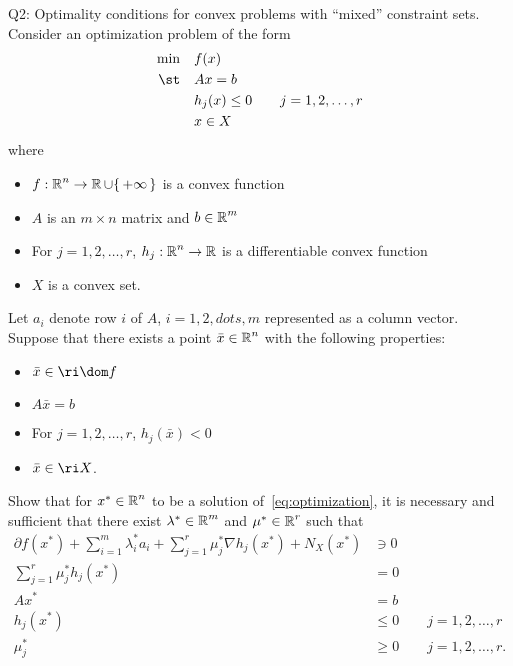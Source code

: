 \documentclass{article}
\begin{document}
\begin{problem}
    {Q2: Optimality conditions for convex problems with ``mixed'' constraint sets.}
    Consider an optimization problem of the form
    \begin{equation}
        \begin{aligned}
            \min & \quad f(x) \\
            \st & \quad Ax=b \\
            & \quad h_j(x)\leq 0 \qquad j=1,2,\dots,r \\
            & \quad x\in X
        \end{aligned}
        \label{eq:optimization}
    \end{equation}
    where
    \begin{itemize}
        \item $f:\R^n\rightarrow\R\cup\set{+\infty}$ is a convex function
        \item $A$ is an $m\times n$ matrix and $b\in\operatorname{\mathbb{R}}^m$
        \item For $j=1,2,\dots,r$, $h_j:\operatorname{\mathbb{R}}^n\rightarrow\operatorname{\mathbb{R}}$ is a differentiable convex function
        \item $X$ is a convex set. 
    \end{itemize}
    Let $a_i$ denote row $i$ of $A$, $i=1,2,dots,m$ represented as a column vector. Suppose that there exists a point $\bar{x}\in\operatorname{\mathbb{R}}^n$ with the following properties:
    \begin{itemize}
        \item $\bar{x}\in\ri\dom f$
        \item $A\bar{x}=b$
        \item For $j=1,2,\dots,r$, $h_j(\bar{x})<0$
        \item $\bar{x}\in\ri X$.
    \end{itemize}
    Show that for $x^*\in\operatorname{\mathbb{R}}^n$ to be a solution of~\cref{eq:optimization}, it is necessary and sufficient that there exist $\lambda^*\in\operatorname{\mathbb{R}}^m$ and $\mu^*\in\operatorname{\mathbb{R}}^r$ such that
    \begin{align*}
        \partial f(x^*)+\sum_{i=1}^{m}\lambda^*_i a_i+\sum_{j=1}^{r}\mu^*_j\nabla h_j(x^*)+N_X(x^*) &\ni 0\\
        \sum_{j=1}^{r}\mu^*_j h_j(x^*) &= 0 \\
        Ax^* &= b \\
        h_j(x^*) &\leq 0 \qquad j=1,2,\dots,r \\
        \mu^*_j &\geq 0 \qquad j=1,2,\dots,r.
    \end{align*}
\end{problem}
\end{document}
